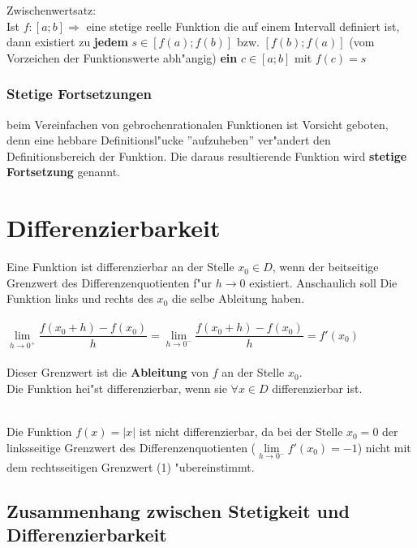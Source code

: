\begin{Definition}
Zwischenwertsatz:\\
Ist $f:[a;b]\Rightarrow$ eine stetige reelle Funktion die auf einem Intervall definiert ist, dann existiert zu \textbf{jedem} $s \in [f(a);f(b)]$ bzw. $[f(b);f(a)]$ (vom Vorzeichen der Funktionswerte abh"angig) \textbf{ein} $c \in [a;b] $ mit $f(c)=s$
\end{Definition}

\subsubsection{Stetige Fortsetzungen}

beim Vereinfachen von gebrochenrationalen Funktionen ist Vorsicht geboten, denn eine hebbare Definitionsl"ucke ''aufzuheben'' ver"andert den Definitionsbereich der Funktion. Die daraus resultierende Funktion wird \textbf{stetige Fortsetzung} genannt.



\section{Differenzierbarkeit}

\begin{Definition}
Eine Funktion ist differenzierbar an der Stelle $x_{0} \in D$, wenn der beitseitige Grenzwert des Differenzenquotienten f"ur $h\rightarrow 0$ existiert. Anschaulich soll Die Funktion links und rechts des $x_{0}$ die selbe Ableitung haben. \\
\\
$\lim\limits_{h \rightarrow 0^{+}} {\dfrac{f(x_{0}+h)-f(x_{0})}{h}} = \lim\limits_{h \rightarrow 0^{-}} {\dfrac{f(x_{0}+h)-f(x_{0})}{h}} =f'(x_{0})$\\
\\
Dieser Grenzwert ist die \textbf{Ableitung} von $f$ an der Stelle $x_{0}$.\\
Die Funktion hei"st differenzierbar, wenn sie $\forall x \in D$ differenzierbar ist.\\
\end{Definition}
\\
Die Funktion $f(x)=|x|$ ist nicht differenzierbar, da bei der Stelle $x_{0}=0$ der linksseitige Grenzwert des Differenzenquotienten ($\lim\limits_{h \rightarrow 0^{-}}{f'(x_{0})=-1}$) nicht mit dem rechtsseitigen Grenzwert (1) "ubereinstimmt.\\

\subsection{Zusammenhang zwischen Stetigkeit und Differenzierbarkeit}

